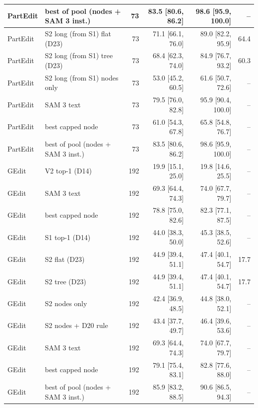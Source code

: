 \begin{tabular}{llrrrr}
PartEdit & best of pool (nodes + SAM 3 inst.) & 73 & 83.5 \scriptsize{[80.6, 86.2]} & 98.6 \scriptsize{[95.9, 100.0]} & -- \\
\midrule
PartEdit & S2 long (from S1) flat (D23) & 73 & 71.1 \scriptsize{[66.1, 76.0]} & 89.0 \scriptsize{[82.2, 95.9]} & 64.4 \\
PartEdit & S2 long (from S1) tree (D23) & 73 & 68.4 \scriptsize{[62.3, 74.0]} & 84.9 \scriptsize{[76.7, 93.2]} & 60.3 \\
PartEdit & S2 long (from S1) nodes only & 73 & 53.0 \scriptsize{[45.2, 60.5]} & 61.6 \scriptsize{[50.7, 72.6]} & -- \\
PartEdit & SAM 3 text & 73 & 79.5 \scriptsize{[76.0, 82.8]} & 95.9 \scriptsize{[90.4, 100.0]} & -- \\
PartEdit & best capped node & 73 & 61.0 \scriptsize{[54.3, 67.8]} & 65.8 \scriptsize{[54.8, 76.7]} & -- \\
PartEdit & best of pool (nodes + SAM 3 inst.) & 73 & 83.5 \scriptsize{[80.6, 86.2]} & 98.6 \scriptsize{[95.9, 100.0]} & -- \\
\midrule
GEdit & V2 top-1 (D14) & 192 & 19.9 \scriptsize{[15.1, 25.0]} & 19.8 \scriptsize{[14.6, 25.5]} & -- \\
GEdit & SAM 3 text & 192 & 69.3 \scriptsize{[64.4, 74.3]} & 74.0 \scriptsize{[67.7, 79.7]} & -- \\
GEdit & best capped node & 192 & 78.8 \scriptsize{[75.0, 82.6]} & 82.3 \scriptsize{[77.1, 87.5]} & -- \\
GEdit & S1 top-1 (D14) & 192 & 44.0 \scriptsize{[38.3, 50.0]} & 45.3 \scriptsize{[38.5, 52.6]} & -- \\
\midrule
GEdit & S2 flat (D23) & 192 & 44.9 \scriptsize{[39.4, 51.1]} & 47.4 \scriptsize{[40.1, 54.7]} & 17.7 \\
GEdit & S2 tree (D23) & 192 & 44.9 \scriptsize{[39.4, 51.1]} & 47.4 \scriptsize{[40.1, 54.7]} & 17.7 \\
GEdit & S2 nodes only & 192 & 42.4 \scriptsize{[36.9, 48.5]} & 44.8 \scriptsize{[38.0, 52.1]} & -- \\
GEdit & S2 nodes + D20 rule & 192 & 43.4 \scriptsize{[37.7, 49.7]} & 46.4 \scriptsize{[39.6, 53.6]} & -- \\
GEdit & SAM 3 text & 192 & 69.3 \scriptsize{[64.4, 74.3]} & 74.0 \scriptsize{[67.7, 79.7]} & -- \\
GEdit & best capped node & 192 & 79.1 \scriptsize{[75.4, 83.1]} & 82.8 \scriptsize{[77.6, 88.0]} & -- \\
GEdit & best of pool (nodes + SAM 3 inst.) & 192 & 85.9 \scriptsize{[83.2, 88.5]} & 90.6 \scriptsize{[86.5, 94.3]} & -- \\

\end{tabular}
